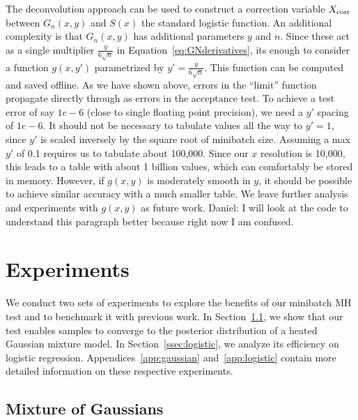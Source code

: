\documentclass{article}
\begin{document}
The deconvolution approach can be used to construct a correction variable
$X_{\rm corr}$ between $G_n(x,y)$ and $S(x)$ the standard logistic function. An
additional complexity is that $G_n(x,y)$ has additional parameters $y$ and $n$.
Since these act as a single multiplier $\frac{y}{6\sqrt{n}}$ in
Equation~\ref{eq:GNderivatives}, its enough to consider a function $g(x,y')$
parametrized by $y'= \frac{y}{6\sqrt{n}}$. This function can be computed and
saved offline. As we have shown above, errors in the ``limit'' function
propagate directly through as errors in the acceptance test.  To achieve a test
error of say $1e-6$ (close to single floating point precision), we need a $y'$
spacing of $1e-6$. It should not be necessary to tabulate values all the way to
$y'=1$, since $y'$ is scaled inversely by the square root of minibatch size.
Assuming a max $y'$ of 0.1 requires us to tabulate about 100,000.  Since our $x$
resolution is 10,000, this leads to a table with about 1 billion values, which
can comfortably be stored in memory.  However, if $g(x,y)$ is moderately smooth
in $y$, it should be possible to achieve similar accuracy with a much smaller
table. We leave further analysis and experiments with $g(x,y)$ as future work.
{\color{blue} Daniel: I will look at the code to understand this paragraph
better because right now I am confused.}




\section{Experiments}\label{sec:experiments}

We conduct two sets of experiments to explore the benefits of our minibatch MH
test and to benchmark it with previous work. In Section~\ref{ssec:gaussians}, we
show that our test enables samples to converge to the posterior distribution of
a heated Gaussian mixture model. In Section~\ref{ssec:logistic}, we analyze its
efficiency on logistic regression.  Appendices~\ref{app:gaussian}
and~\ref{app:logistic} contain more detailed information on these respective
experiments.

\subsection{Mixture of Gaussians}\label{ssec:gaussians}
\end{document}
